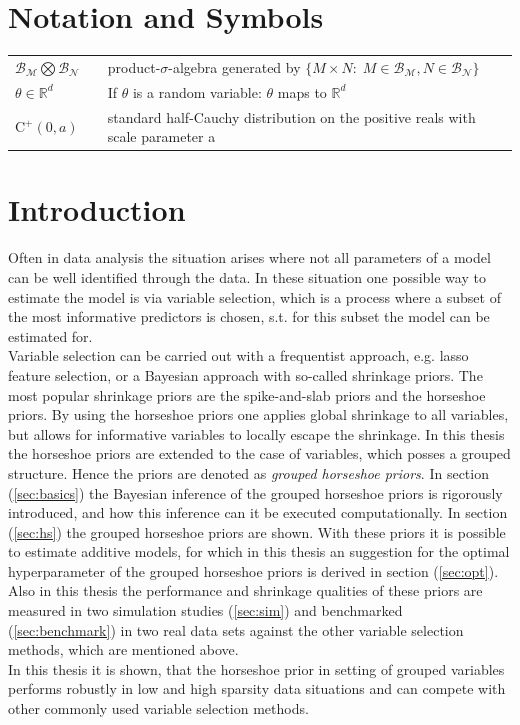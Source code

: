 \documentclass[12pt,letterpaper]{article}
\numberwithin{equation}{subsection}
\begin{document}
\newpage
\setcounter{page}{1}
\tableofcontents
\newpage


\pagestyle{fancy}
\fancyhf{}
\fancyhead[R]{\thepage}
\renewcommand{\headrulewidth}{0pt} 
\section*{Notation and Symbols}

\begin{tabular}{lll}
$\mathcal{B}_\mathcal{M}\bigotimes\mathcal{B}_\mathcal{N}$ & & product-$\sigma$-algebra generated by $\{M\times N :\; M\in\mathcal{B}_\mathcal{M}, N\in\mathcal{B}_\mathcal{N} \}$ \\
$\theta \in \mathbb{R}^d$ & & If $\theta$ is a random variable: $\theta$ maps to $\mathbb{R}^d$ \\
$\text{C}^+(0,a)$ & & standard half-Cauchy distribution on the positive reals with scale parameter a
\end{tabular}

\pagebreak
\section{Introduction}
Often in data analysis the situation arises where not all parameters of a model can be well identified through the data. In these situation one possible way to estimate the model is via variable selection, which is a process where a subset of the most informative predictors is chosen, s.t. for this subset the model can be estimated for. \\ 
Variable selection can be carried out with a frequentist approach, e.g. lasso feature selection, or a Bayesian approach with so-called shrinkage priors. The most popular shrinkage priors are the spike-and-slab priors and the horseshoe priors. By using the horseshoe priors one applies global shrinkage to all variables, but allows for informative variables to locally escape the shrinkage. In this thesis the horseshoe priors are extended to the case of variables, which posses a grouped structure. Hence the priors are denoted as \textit{grouped horseshoe priors}. In section (\ref{sec:basics}) the Bayesian inference of the grouped horseshoe priors is rigorously introduced, and how this inference can it be executed computationally. In section (\ref{sec:hs}) the grouped horseshoe priors are shown. With these priors it is possible to estimate additive models, for which in this thesis an suggestion for the optimal hyperparameter of the grouped horseshoe priors is derived in section (\ref{sec:opt}). Also in this thesis the performance and shrinkage qualities of these priors are measured in two simulation studies (\ref{sec:sim}) and benchmarked (\ref{sec:benchmark}) in two real data sets against the other variable selection methods, which are mentioned above. \\
In this thesis it is shown, that the horseshoe prior in setting of grouped variables performs robustly in low and high sparsity data situations and can compete with other commonly used variable selection methods.
\pagebreak
\end{document}

